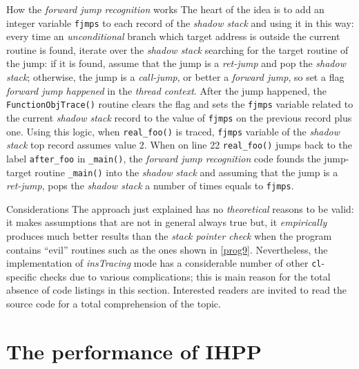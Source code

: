 \documentclass[a4paper,10pt]{report}
\begin{document}
\begin{paragraph}{How the \emph{forward jump recognition} works}
The heart of the idea is to add an integer variable \verb|fjmps| to each
record of the \emph{shadow stack} and using it in this way:
every time an \emph{unconditional} branch which target address is outside
the current routine is found, iterate over the \emph{shadow stack} searching
for the target routine of the jump: if it is found, assume that the jump is
a \emph{ret-jump} and pop the \emph{shadow stack}; otherwise, the jump
is a \emph{call-jump}, or better a \emph{forward jump},
so set a flag \emph{forward jump happened} in the \emph{thread context}.
After the jump happened, the \verb|FunctionObjTrace()| routine clears the flag
and sets the \verb|fjmps| variable related to the current \emph{shadow stack} record
to the value of \verb|fjmps| on the previous record plus one.
Using this logic, when \verb|real_foo()| is traced, \verb|fjmps| variable
of the \emph{shadow stack} top record assumes value 2.
When on line 22 \verb|real_foo()| jumps back to the label \verb|after_foo| in
\verb|_main()|, the \emph{forward jump recognition} code founds the
jump-target routine \verb|_main()| into the \emph{shadow stack} and
assuming that the jump is a \emph{ret-jump}, pops the \emph{shadow stack}
a number of times equals to \verb|fjmps|.
\end{paragraph}

\begin{paragraph}{Considerations}
The approach just explained has no \emph{theoretical} reasons to be valid:
it makes assumptions that are not in general always true but, it \emph{empirically}
produces much better results than the \emph{stack pointer check} when the program
contains ``evil'' routines such as the ones shown in \cref{prog9}.
Nevertheless, the implementation of \emph{insTracing} mode has
a considerable number of other \verb|cl|-specific checks
due to various complications; this is main reason for the total absence of
code listings in this section.
Interested readers are invited to read the source code for a total comprehension
of the topic.

\end{paragraph}

\section{The performance of IHPP}
\end{document}
